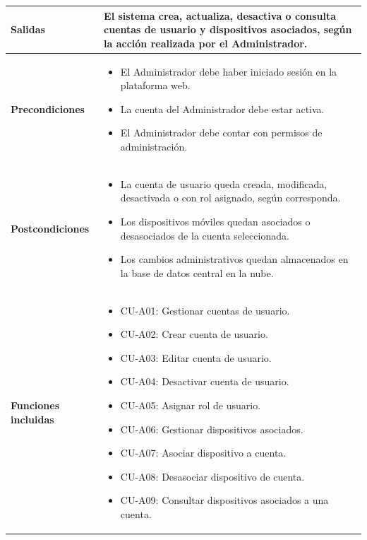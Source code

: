 \begin{longtable}{|p{3.3cm}|p{10cm}|}
\textbf{Salidas} & 
El sistema crea, actualiza, desactiva o consulta cuentas de usuario y dispositivos asociados, según la acción realizada por el Administrador. \\ \hline

\textbf{Precondiciones} & 
\begin{itemize}
    \item El Administrador debe haber iniciado sesión en la plataforma web.
    \item La cuenta del Administrador debe estar activa.
    \item El Administrador debe contar con permisos de administración.
\end{itemize} \\ \hline

\textbf{Postcondiciones} & 
\begin{itemize}
    \item La cuenta de usuario queda creada, modificada, desactivada o con rol asignado, según corresponda.
    \item Los dispositivos móviles quedan asociados o desasociados de la cuenta seleccionada.
    \item Los cambios administrativos quedan almacenados en la base de datos central en la nube.
\end{itemize} \\ \hline

\textbf{Funciones incluidas} &
\begin{itemize}
    \item CU-A01: Gestionar cuentas de usuario.
    \item CU-A02: Crear cuenta de usuario.
    \item CU-A03: Editar cuenta de usuario.
    \item CU-A04: Desactivar cuenta de usuario.
    \item CU-A05: Asignar rol de usuario.
    \item CU-A06: Gestionar dispositivos asociados.
    \item CU-A07: Asociar dispositivo a cuenta.
    \item CU-A08: Desasociar dispositivo de cuenta.
    \item CU-A09: Consultar dispositivos asociados a una cuenta.
\end{itemize} \\ \hline


\end{longtable}
